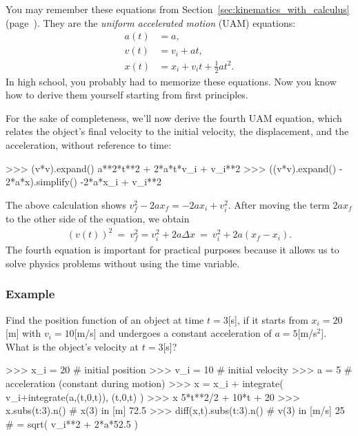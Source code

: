 \noindent
You may remember these equations from 
{Section~\ref{sec:kinematics_with_calculus} (page~\pageref{sec:kinematics_with_calculus}).}
They are the \emph{uniform accelerated motion} (UAM) equations:							
\begin{align*}
 a(t) &= a,                                  \\ 
 v(t) &= v_i  + at,                          \\[-2mm] 
 x(t) &= x_i + v_it + \frac{1}{2}at^2.
\end{align*}
In high school, you probably had to memorize these equations.
Now you know how to derive them yourself starting from first principles.

For the sake of completeness, we'll now derive the fourth UAM equation,
which relates the object's final velocity to the initial velocity,
the displacement, and the acceleration, without reference to time:
\small
\begin{verbatimtab}
>>> (v*v).expand()
a**2*t**2 + 2*a*t*v_i + v_i**2
>>> ((v*v).expand() - 2*a*x).simplify()
-2*a*x_i + v_i**2
\end{verbatimtab}
\normalsize

\noindent
The above calculation shows $v_f^2 - 2ax_f = -2ax_i + v_i^2$.
After moving the term $2ax_f$ to the other side of the equation, we obtain
\begin{align*}
 (v(t))^2 \ = \ v_f^2 =  v_i^2  + 2a\Delta x \ = \  v_i^2  + 2a(x_f-x_i).
\end{align*}  
The fourth equation is important for practical purposes
because it allows us to solve physics problems without using the time variable.


\subsubsection{Example}

Find the position function of an object at time $t =3$[s], 
if it starts from $x_i=20$[m] with $v_i=10$[m/s] and undergoes 
a constant acceleration of $a=5$[m/s$^2$].
What is the object's velocity at $t=3$[s]?

\small
\begin{verbatimtab}
>>> x_i = 20   # initial position
>>> v_i = 10   # initial velocity
>>> a   = 5    # acceleration (constant during motion)
>>> x = x_i + integrate(  v_i+integrate(a,(t,0,t)),  (t,0,t) )   
>>> x
5*t**2/2 + 10*t + 20
>>> x.subs({t:3}).n()           # x(3) in [m]
72.5           
>>> diff(x,t).subs({t:3}).n()   # v(3) in [m/s]
25                              # = sqrt( v_i**2 + 2*a*52.5 )
\end{verbatimtab}
\normalsize

